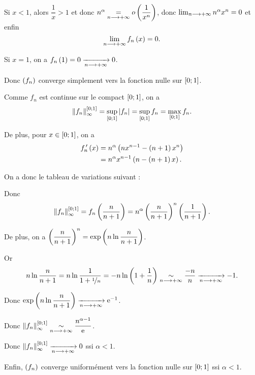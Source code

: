 \begin{corr}~\\
Si \(x<1\), alors \(\dfrac{1}{x}>1\) et donc \(n^\alpha\underset{n\longrightarrow+\infty}{=}o\left(\dfrac{1}{x^n}\right)\), donc \(\lim_{n\longrightarrow+\infty}n^\alpha x^n=0\) et enfin \[\lim_{n\longrightarrow+\infty}f_n\left(x\right)=0.\]

Si \(x=1\), on a \(f_n\left(1\right)=0\xrightarrow[n\longrightarrow+\infty]{}0\).

Donc \(\left(f_n\right)\) converge simplement vers la fonction nulle sur \(\left[0;1\right]\).

Comme \(f_n\) est continue sur le compact \(\left[0;1\right]\), on a \[\norme{f_n}_\infty^{\intervii{0}{1}}=\sup_{\intervii{0}{1}}\abs{f_n}=\sup_{\intervii{0}{1}}f_n=\max_{\intervii{0}{1}}f_n.\]

De plus, pour \(x\in\left[0;1\right]\), on a \[\begin{aligned}
f_n^{\,\prime}\left(x\right)&=n^\alpha\left(nx^{n-1}-\left(n+1\right)x^n\right) \\
&=n^\alpha x^{n-1}\left(n-\left(n+1\right)x\right).
\end{aligned}\]

On a donc le tableau de variations suivant :

\begin{center}
\end{center}

Donc \[\norme{f_n}_\infty^{\intervii{0}{1}}=f_n\paren{\dfrac{n}{n+1}}=n^\alpha\paren{\dfrac{n}{n+1}}^n\paren{\dfrac{1}{n+1}}.\]

De plus, on a \(\left(\dfrac{n}{n+1}\right)^n=\exp\left(n\ln\dfrac{n}{n+1}\right)\).

Or \[n\ln\dfrac{n}{n+1}=n\ln\dfrac{1}{1+\nicefrac{1}{n}}=-n\ln\left(1+\dfrac{1}{n}\right)\underset{n\longrightarrow+\infty}{\sim}\dfrac{-n}{n}\xrightarrow[n\longrightarrow+\infty]{}-1.\]

Donc \(\exp\left(n\ln\dfrac{n}{n+1}\right)\xrightarrow[n\longrightarrow+\infty]{}\mathrm{e}^{-1}\).

Donc \(\norme{f_n}_\infty^{\intervii{0}{1}}\simqd{n\to\pinf}\dfrac{n^{\alpha-1}}{\e{}}\).

Donc \(\norme{f_n}_\infty^{\intervii{0}{1}}\tendqd{n\to\pinf}0\) ssi \(\alpha<1\).

Enfin, \(\left(f_n\right)\) converge uniformément vers la fonction nulle sur \(\left[0;1\right]\) ssi \(\alpha<1\).
\end{corr}

